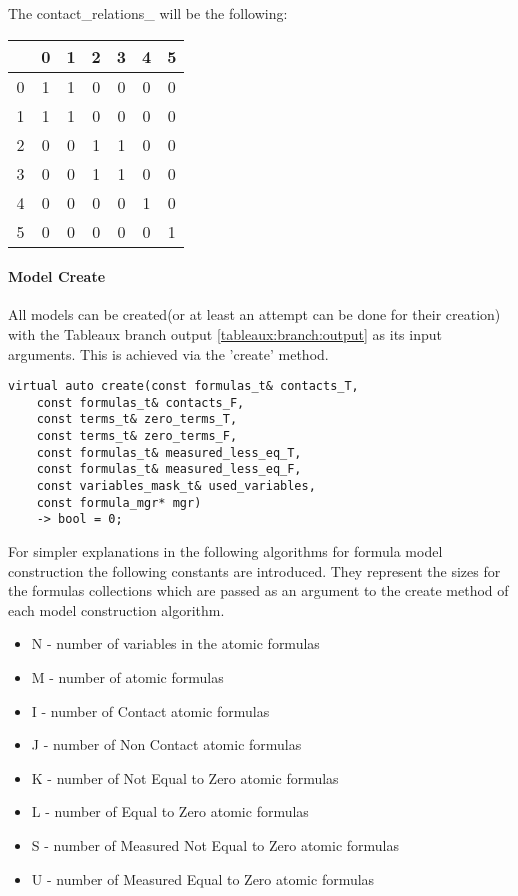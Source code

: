 \documentclass{article}
\begin{document}
			The contact\_relations\_ will be the following:
			\begin{center}
			\begin{tabular}{ |c||c|c|c|c|c|c|}
				\hline
			        	\ & 0 & 1 & 2 & 3 & 4 & 5 \\
				\hline
				\hline
				0 & 1 & 1 & 0 & 0 & 0 & 0 \\
				\hline
				1 & 1 & 1 & 0 & 0 & 0 & 0 \\
				\hline
				2 & 0 & 0 & 1 & 1 & 0 & 0 \\
				\hline
				3 & 0 & 0 & 1 & 1 & 0 & 0 \\
				\hline
				4 & 0 & 0 & 0 & 0 & 1 & 0 \\
				\hline
				5 & 0 & 0 & 0 & 0 & 0 & 1 \\
				\hline
			\end{tabular}
			\end{center}

		\paragraph{Model Create}
		All models can be created(or at least an attempt can be done for their creation) with the Tableaux branch output \ref{tableaux:branch:output} as its input arguments.
		This is achieved via the 'create' method.
		\begin{lstlisting}
virtual auto create(const formulas_t& contacts_T, 
	const formulas_t& contacts_F, 
	const terms_t& zero_terms_T,
	const terms_t& zero_terms_F, 
	const formulas_t& measured_less_eq_T, 
	const formulas_t& measured_less_eq_F, 
	const variables_mask_t& used_variables, 
	const formula_mgr* mgr)
    -> bool = 0;
		\end{lstlisting}
		
		For simpler explanations in the following algorithms for formula model construction the following constants are introduced. 
		They represent the sizes for the formulas collections which are passed as an argument to the create method of each model construction algorithm.
		\begin{itemize}
			\item N - number of variables in the atomic formulas
			\item M - number of atomic formulas
			\item I - number of Contact atomic formulas
			\item J - number of Non Contact atomic formulas
			\item K - number of Not Equal to Zero atomic formulas
			\item L - number of Equal to Zero atomic formulas
			\item S - number of Measured Not Equal to Zero atomic formulas
			\item U - number of Measured Equal to Zero atomic formulas
		\end{itemize}
\end{document}
